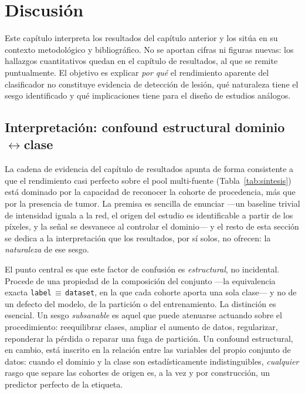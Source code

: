 \chapter{Discusión}

Este capítulo interpreta los resultados del capítulo anterior y los sitúa en su
contexto metodológico y bibliográfico. No se aportan cifras ni figuras nuevas:
los hallazgos cuantitativos quedan en el capítulo de resultados, al que se remite
puntualmente. El objetivo es explicar \emph{por qué} el rendimiento aparente del
clasificador no constituye evidencia de detección de lesión, qué naturaleza tiene
el sesgo identificado y qué implicaciones tiene para el diseño de estudios
análogos.

\section{Interpretación: confound estructural \texorpdfstring{dominio$\leftrightarrow$clase}{dominio-clase}}

La cadena de evidencia del capítulo de resultados apunta de forma consistente a
que el rendimiento casi perfecto sobre el pool multi-fuente
(Tabla~\ref{tab:sintesis}) está dominado por la capacidad de reconocer la cohorte
de procedencia, más que por la presencia de tumor. La premisa es sencilla de enunciar
---un baseline trivial de intensidad iguala a la red, el origen del estudio es
identificable a partir de los píxeles, y la señal se desvanece al controlar el
dominio--- y el resto de esta sección se dedica a la interpretación que los
resultados, por sí solos, no ofrecen: la \emph{naturaleza} de ese sesgo.

El punto central es que este factor de confusión es \emph{estructural}, no
incidental. Procede de una propiedad de la composición del conjunto ---la equivalencia
exacta \texttt{label}\,$\equiv$\,\texttt{dataset}, en la que cada cohorte aporta
una sola clase--- y no de un defecto del modelo, de la partición o del
entrenamiento. La distinción es esencial. Un sesgo \emph{subsanable} es aquel que
puede atenuarse actuando sobre el procedimiento: reequilibrar clases, ampliar el
aumento de datos, regularizar, reponderar la pérdida o reparar una fuga de
partición. Un confound estructural, en cambio, está inscrito en la relación entre
las variables del propio conjunto de datos: cuando el dominio y la clase son
estadísticamente indistinguibles, \emph{cualquier} rasgo que separe las cohortes
de origen es, a la vez y por construcción, un predictor perfecto de la etiqueta.

